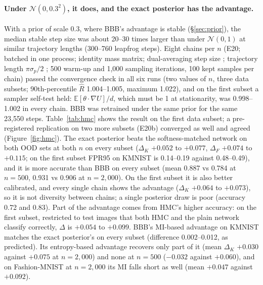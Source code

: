 \documentclass[11pt]{article}
\begin{document}
\paragraph{Under $\mathcal N(0, 0.3^2)$, it does, and the exact posterior has
the advantage.} With a prior of scale 0.3, where BBB's advantage is stable
(\S\ref{sec:prior}), the median stable step size was about 20--30 times larger than under
$\mathcal N(0,1)$ at similar trajectory lengths (300--760 leapfrog steps). Eight
chains per $n$ (E20; batched in one process; identity mass matrix;
dual-averaging step size \citep{hoffman2014nuts}; trajectory length
$\pi\sigma_p/2$ \citep{izmailov2021what}; 500 warm-up and 1{,}000 sampling
iterations, 100 kept samples per chain) passed the convergence check in all six runs
(two values of $n$, three data subsets; 90th-percentile $\hat R$ 1.004--1.005,
maximum 1.022), and on the first subset a sampler self-test held:
$\mathbb E[\theta\cdot\nabla U]/d$, which must be 1 at stationarity, was
0.998--1.002 in every chain. BBB was retrained under
the same prior for the same 23{,}550 steps. Table~\ref{tab:hmc} shows
the result on the first data subset; a pre-registered replication on two
more subsets (E20b) converged as well and agreed (Figure~\ref{fig:hmc}). The exact posterior beats the
softness-matched network on both OOD sets at both $n$ on every subset
($\Delta_K$ $+0.052$ to $+0.077$, $\Delta_F$ $+0.074$ to $+0.115$; on the first
subset FPR95 on KMNIST is 0.14--0.19 against 0.48--0.49), and it is more
accurate than BBB on every subset (mean 0.887 vs 0.784 at $n=500$, 0.931 vs
0.906 at $n=2{,}000$). On the first subset it is also better calibrated, and
every single chain shows the advantage ($\Delta_K$ $+0.064$ to $+0.073$), so it is not
diversity between chains; a single posterior draw is poor (accuracy 0.72 and
0.83). Part of the advantage comes from HMC's higher accuracy: on the first
subset, restricted to test images that both HMC and the plain network
classify correctly, $\Delta$ is
$+0.054$ to $+0.099$. BBB's MI-based advantage on KMNIST matches the exact
posterior's on every subset (difference 0.002--0.012, as predicted). Its
entropy-based advantage recovers only part of it (mean $\Delta_K$ $+0.030$ against
$+0.075$ at $n=2{,}000$) and none at $n=500$ ($-0.032$ against $+0.060$), and on
Fashion-MNIST at $n=2{,}000$ its MI falls short as well (mean $+0.047$ against
$+0.092$).
\end{document}
